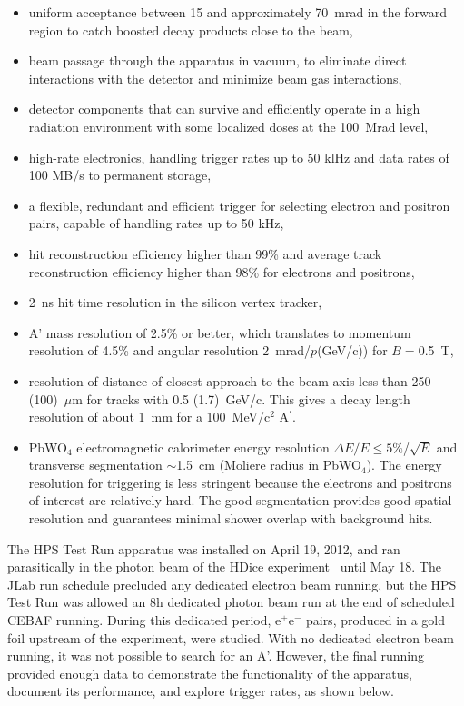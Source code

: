 \documentclass[final,3p,times,twocolumn]{elsarticle}
\newcommand{\Aprime}{A\ensuremath{^\prime}}
\newcommand{\ee}{e$^+$e$^-$}
\begin{document}
\begin{itemize}
\item uniform acceptance between 15 and approximately 70~mrad in the forward region to catch boosted decay products close to the beam, 
\item beam passage through the apparatus in vacuum, to eliminate direct interactions with the 
detector and minimize beam gas interactions, 
\item detector components that can survive and efficiently operate in a high radiation environment 
with some localized doses at the 100~Mrad level,
\item high-rate electronics, handling trigger rates up to 50 klHz and data rates of 100 MB/s to permanent 
storage, 
\item a flexible, redundant and efficient trigger for selecting electron and positron pairs,
capable of handling rates up to 50 kHz,
\item hit reconstruction efficiency higher than 99\% and average track reconstruction efficiency higher than 98\% for electrons and positrons,
\item 2~ns hit time resolution in the silicon vertex tracker, 
\item A' mass resolution of 2.5\% or better, which translates to momentum resolution of 4.5\% and angular 
resolution 2~mrad/$p$(GeV/c)) for $B$$=$0.5~T,
\item resolution of distance of closest approach to the beam axis less than 250 (100)~$\mu$m for tracks with 
0.5 (1.7)~GeV/c. This gives a decay length resolution of about 1~mm for a 100~MeV/c$^2$ \Aprime{}.
\item PbWO$_{4}$ electromagnetic calorimeter energy resolution $\Delta E/E$$\leq$$5\%$/$\sqrt{E}$ and transverse
segmentation $\sim$1.5~cm (Moliere radius in PbWO$_{4}$).  The energy resolution for triggering is less 
stringent because the electrons and positrons of interest are relatively hard. 
The good segmentation provides good spatial resolution and guarantees minimal shower overlap with background hits.
\end{itemize}

The HPS Test Run apparatus was installed on April 19, 2012, and ran parasitically in the photon beam of the HDice 
experiment~\cite{HDice} until May 18. The JLab run schedule 
precluded any dedicated electron beam running, but the HPS Test Run was allowed an 8h dedicated photon beam run at the end of scheduled CEBAF running. During this dedicated 
period, \ee{} pairs, produced in a gold foil upstream of the experiment, were studied. With no dedicated 
electron beam running, it was not possible to search for an A'. However, the final running
provided enough data to demonstrate the functionality of the apparatus, document its performance, and 
explore trigger rates, as shown below.
\end{document}
